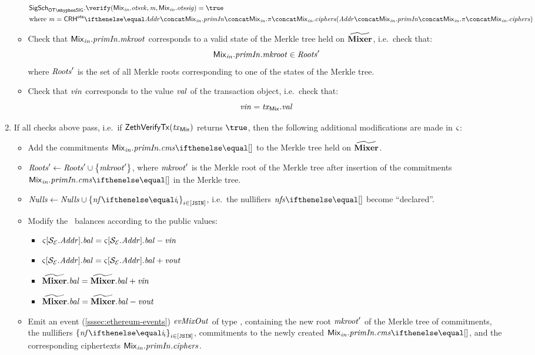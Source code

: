 \begin{enumerate}
\begin{itemize}
                \begin{align*}
                    & \otsigscheme.\verify(\inp{\mix}.\otsvk, \msg, \inp{\mix}.\otssig) = \true \\
                    & \text{where} \ \msg = \crhots{\addr \concat \inp{\mix}.\primInp \concat \inp{\mix}.\zkp \concat \inp{\mix}.\ciphers}
                \end{align*}
            \item Check that $\mathit{{\mathsf{Mix}}_{in}}.\mathit{primIn}.\mathit{mkroot}$ corresponds to a valid state of the Merkle tree held on $\widetilde{\mathbf{Mixer}}$, i.e.~check that:
                \[
                    \mathit{{\mathsf{Mix}}_{in}}.\mathit{primIn}.\mathit{mkroot} \in \mathit{Roots}'
                \]
                where $\mathit{Roots}'$ is the set of all Merkle roots corresponding to one of the states of the Merkle tree.
            \item Check that $\mathit{vin}$ corresponds to the value $\mathit{val}$ of the transaction object, i.e.~check that:
                \[
                    \mathit{vin} = \mathit{\mathit{tx}_{\mathsf{Mix}}}.\mathit{val}
                \]
        \end{itemize}
    \item If all checks above pass, i.e.~if $\mathsf{ZethVerifyTx}(\mathit{\mathit{tx}_{\mathsf{Mix}}})$ returns $\true$, then the following additional modifications are made in $\mathit{\varsigma}$:
        \begin{itemize}
            \item Add the commitments $\inp{\mix}.\primInp.\cms{}$ to the Merkle tree held on $\widetilde{\mathbf{Mixer}}$.
            \item $\mathit{Roots}' \gets \mathit{Roots}' \cup \left\{{\mathit{mkroot}'}\right\}$, where $\mathit{mkroot}'$ is the Merkle root of the Merkle tree after insertion of the commitments $\inp{\mix}.\primInp.\cms{}$ in the Merkle tree.
            \item $\nullifierset \gets \nullifierset \cup \indexedset{\nf{i}}{i \in [\jsin]}$, i.e.~the nullifiers $\nfs{}$ become ``declared''.
            \item Modify the \ethereum~balances according to the public values:
                \begin{itemize}
                    \item $\mathit{\varsigma}[\mathcal{{S}_{E}}.\mathit{Addr}].\mathit{bal} = \mathit{\varsigma}[\mathcal{{S}_{E}}.\mathit{Addr}].\mathit{bal} - \mathit{vin}$
                    \item $\mathit{\varsigma}[\mathcal{{S}_{E}}.\mathit{Addr}].\mathit{bal} = \mathit{\varsigma}[\mathcal{{S}_{E}}.\mathit{Addr}].\mathit{bal} + \mathit{vout}$
                    \item $\widetilde{\mathbf{Mixer}}.\mathit{bal} = \widetilde{\mathbf{Mixer}}.\mathit{bal} + \mathit{vin}$
                    \item $\widetilde{\mathbf{Mixer}}.\mathit{bal} = \widetilde{\mathbf{Mixer}}.\mathit{bal} - \mathit{vout}$
                \end{itemize}
            \item Emit an event (\cref{sssec:ethereum-events}) $\mathit{evMixOut}$ of type \mixEventDType, containing the new root $\mathit{mkroot}'$ of the Merkle tree of commitments, the nullifiers $\indexedset{\nf{i}}{i \in [\jsin]}$, commitments to the newly created \zethnotes $\inp{\mix}.\primInp.\cms{}$, and the corresponding ciphertexts $\mathit{{\mathsf{Mix}}_{in}}.\mathit{primIn}.\mathit{ciphers}$.
        \end{itemize}
\end{enumerate}
